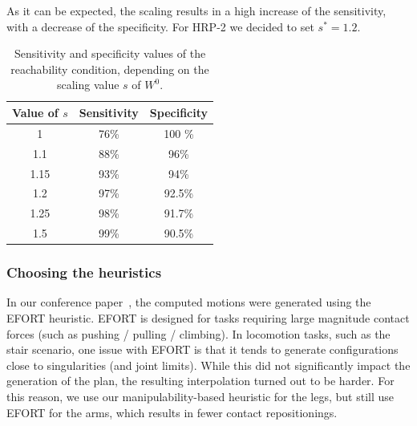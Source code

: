 \documentclass[journal]{IEEEtran}
\begin{document}
As it can be expected, the scaling results in a high increase of the sensitivity, with a decrease of the specificity.
For HRP-2 we decided to set $s^*=1.2$.

\begin{table}
\centering
\footnotesize
\begin{tabular}{c | c | c}
   Value of $s$ &  Sensitivity & Specificity\\
 \hline
   1   & 76\% & 100 \%\\
   1.1& 88\% & 96\% \\
   1.15& 93\% & 94\%\\
   1.2 & 97\% & 92.5\%\\
   1.25& 98\% & 91.7\%\\
   1.5 & 99\% & 90.5\%\\
 \end{tabular}
\caption{Sensitivity and specificity values of the reachability condition, depending on the scaling value $s$ of $W^0$.}
\label{tab:scale}
\quad
\end{table}

\subsubsection{Choosing the heuristics} \label{sec:heuristichoices}
In our conference paper~\citep{tonneauisrr15}, the computed motions were generated using the EFORT heuristic.
EFORT is designed for tasks requiring large magnitude contact forces (such as pushing / pulling / climbing). 
In locomotion tasks, such as the stair scenario, one issue with EFORT is that it tends to generate
configurations close to singularities (and joint limits). While this did not significantly impact
the generation of the plan, the resulting interpolation turned out to be harder.
For this reason, we use our manipulability-based heuristic for the legs, but still
use EFORT for the arms, which results in fewer contact repositionings.

\end{document}
